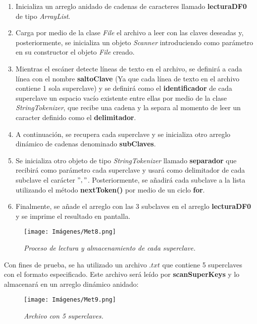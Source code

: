 \documentclass[letterpaper,12pt]{extarticle}
\begin{document}
\begin{enumerate}
\item Inicializa un arreglo anidado de cadenas de caracteres llamado \textbf{lecturaDF0} de tipo \textit{ArrayList}.

\item Carga por medio de la clase \textit{File} el archivo a leer con las claves deseadas y, posteriormente, se inicializa un objeto \textit{Scanner} introduciendo como parámetro en su constructor el objeto \textit{File} creado.

\item Mientras el escáner detecte líneas de texto en el archivo, se definirá a cada línea con el nombre \textbf{saltoClave} (Ya que cada línea de texto en el archivo contiene 1 sola superclave) y se definirá como el \textbf{identificador} de cada superclave un espacio vacío existente entre ellas por medio de la clase \textit{StringTokenizer}, que recibe una cadena y la separa al momento de leer un caracter definido como el \textbf{delimitador}.

\item A continuación, se recupera cada superclave y se inicializa otro arreglo dinámico de cadenas denominado \textbf{subClaves}.

\item Se inicializa otro objeto de tipo \textit{StringTokenizer} llamado \textbf{separador} que recibirá como parámetro cada superclave y usará como delimitador de cada subclave el carácter $","$. Posteriormente, se añadirá cada subclave a la lista utilizando el método \textbf{nextToken()} por medio de un ciclo \textbf{for}.

\item Finalmente, se añade el arreglo con las 3 subclaves en el arreglo \textbf{lecturaDF0} y se imprime el resultado en pantalla. 

\end{enumerate}

\begin{figure}[h!]
\centering
\texttt{[image: Imágenes/Met8.png]}
\caption{\textit{Proceso de lectura y almacenamiento de cada superclave.}}
\label{fig:Met8}
\end{figure}

Con fines de prueba, se ha utilizado un archivo $.txt$ que contiene 5 superclaves con el formato especificado. Este archivo será leído por \textbf{scanSuperKeys} y lo almacenará en un arreglo dinámico anidado:

\begin{figure}[h!]
\centering
\texttt{[image: Imágenes/Met9.png]}
\caption{\textit{Archivo con 5 superclaves.}}
\label{fig:Met9}
\end{figure}
\end{document}
